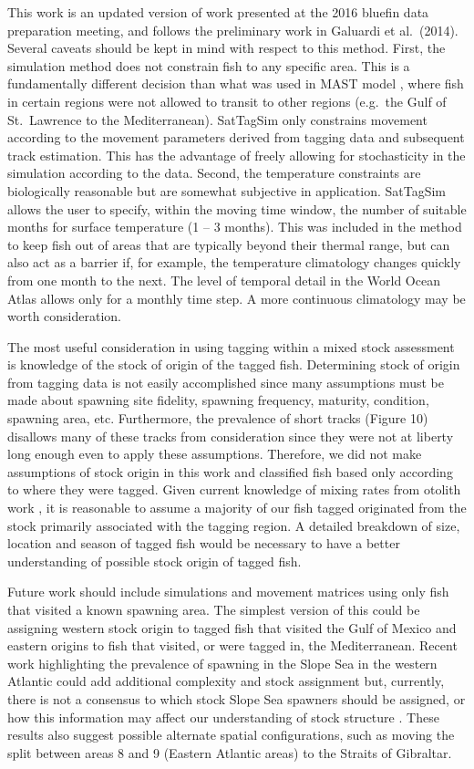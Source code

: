 \documentclass[
  authoryear,
  preprint,
  5p,
  onecolumn]{elsarticle}
\begin{document}
This work is an updated version of work presented at the 2016 bluefin
data preparation meeting, and follows the preliminary work in Galuardi
et al.~(2014). Several caveats should be kept in mind with respect to
this method. First, the simulation method does not constrain fish to any
specific area. This is a fundamentally different decision than what was
used in MAST model \citep{taylor2011}, where fish in certain regions
were not allowed to transit to other regions (e.g.~the Gulf of
St.~Lawrence to the Mediterranean). SatTagSim only constrains movement
according to the movement parameters derived from tagging data and
subsequent track estimation. This has the advantage of freely allowing
for stochasticity in the simulation according to the data. Second, the
temperature constraints are biologically reasonable but are somewhat
subjective in application. SatTagSim allows the user to specify, within
the moving time window, the number of suitable months for surface
temperature (1 -- 3 months). This was included in the method to keep
fish out of areas that are typically beyond their thermal range, but can
also act as a barrier if, for example, the temperature climatology
changes quickly from one month to the next. The level of temporal detail
in the World Ocean Atlas allows only for a monthly time step. A more
continuous climatology may be worth consideration.

The most useful consideration in using tagging within a mixed stock
assessment is knowledge of the stock of origin of the tagged fish.
Determining stock of origin from tagging data is not easily accomplished
since many assumptions must be made about spawning site fidelity,
spawning frequency, maturity, condition, spawning area, etc.
Furthermore, the prevalence of short tracks (Figure 10) disallows many
of these tracks from consideration since they were not at liberty long
enough even to apply these assumptions. Therefore, we did not make
assumptions of stock origin in this work and classified fish based only
according to where they were tagged. Given current knowledge of mixing
rates from otolith work \citep[\emph{e.g.},][]{rooker2014, siskey2016},
it is reasonable to assume a majority of our fish tagged originated from
the stock primarily associated with the tagging region. A detailed
breakdown of size, location and season of tagged fish would be necessary
to have a better understanding of possible stock origin of tagged fish.

Future work should include simulations and movement matrices using only
fish that visited a known spawning area. The simplest version of this
could be assigning western stock origin to tagged fish that visited the
Gulf of Mexico and eastern origins to fish that visited, or were tagged
in, the Mediterranean. Recent work highlighting the prevalence of
spawning in the Slope Sea in the western Atlantic \citep{richardson2016}
could add additional complexity and stock assignment but, currently,
there is not a consensus to which stock Slope Sea spawners should be
assigned, or how this information may affect our understanding of stock
structure \citep{walter2016}. These results also suggest possible
alternate spatial configurations, such as moving the split between areas
8 and 9 (Eastern Atlantic areas) to the Straits of Gibraltar.
\end{document}
